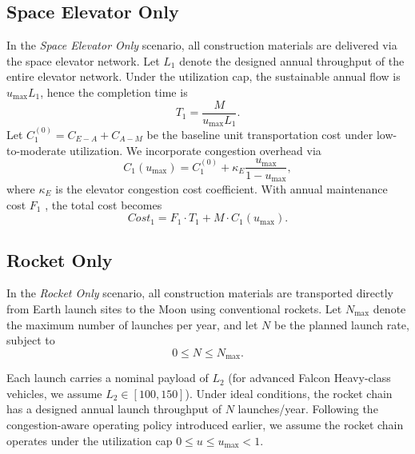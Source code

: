 \documentclass{mcmthesis}
\begin{document}
\subsection{Space Elevator Only}
In the \emph{Space Elevator Only} scenario, all construction materials are delivered via the space elevator network.
Let $L_1$ denote the designed annual throughput of the entire elevator network. Under the utilization cap,
the sustainable annual flow is $u_{\max}L_1$, hence the completion time is
\begin{equation}
T_1=\frac{M}{u_{\max}L_1}.
\end{equation}
Let $C_1^{(0)}=C_{E-A}+C_{A-M}$ be the baseline unit transportation cost under low-to-moderate utilization.
We incorporate congestion overhead via
\begin{equation}
C_1(u_{\max})=C_1^{(0)}+\kappa_E\frac{u_{\max}}{1-u_{\max}},
\end{equation}
where $\kappa_E$ is the elevator congestion cost coefficient.
With annual maintenance cost $F_1$ , the total cost becomes
\begin{equation}
Cost_1=F_1\cdot T_1+M\cdot C_1(u_{\max}).
\end{equation}

\subsection{Rocket Only}
In the \emph{Rocket Only} scenario, all construction materials are transported directly from Earth launch sites to the Moon using conventional rockets. 
Let $N_{\max}$ denote the maximum number of launches per year, and let $N$ be the planned launch rate, subject to
\begin{equation}
0 \le N \le N_{\max}.
\end{equation}

Each launch carries a nominal payload of $L_2$ (for advanced Falcon Heavy-class vehicles, we assume $L_2\in[100,150]$). 
Under ideal conditions, the rocket chain has a designed annual launch throughput of $N$ launches/year. 
Following the congestion-aware operating policy introduced earlier, we assume the rocket chain operates under the utilization cap $0\le u \le u_{\max}<1$.
\end{document}
